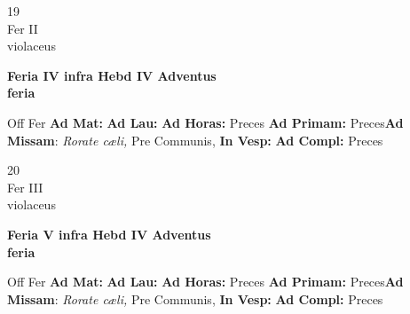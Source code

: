 \documentclass[10pt, openany]{book}
\begin{document}
    \begin{center}
        \begin{minipage}{3.5in}
            \vspace{2em}
            \begin{minipage}{0.5in}
                {\Huge 19} \\
                {\normalsize Fer II} \\
                {\normalsize violaceus}
            \end{minipage}
            \begin{minipage}{3.0in}
                \textbf{ \large Feria IV infra Hebd IV Adventus \\
                \textnormal{\normalsize feria}} \\ 
            \end{minipage}
            \begin{justify}Off Fer
                \textbf{Ad Mat: }
                \textbf{Ad Lau: }
                \textbf{Ad Horas: }Preces
                \textbf{Ad Primam: }Preces\textbf{Ad Missam}: \textit{Rorate cæli,} Pre Communis,  
                \textbf{In Vesp: }
                \textbf{Ad Compl: }Preces
            \end{justify}
        \end{minipage}
    \end{center}

    \begin{center}
        \begin{minipage}{3.5in}
            \vspace{2em}
            \begin{minipage}{0.5in}
                {\Huge 20} \\
                {\normalsize Fer III} \\
                {\normalsize violaceus}
            \end{minipage}
            \begin{minipage}{3.0in}
                \textbf{ \large Feria V infra Hebd IV Adventus \\
                \textnormal{\normalsize feria}} \\ 
            \end{minipage}
            \begin{justify}Off Fer
                \textbf{Ad Mat: }
                \textbf{Ad Lau: }
                \textbf{Ad Horas: }Preces
                \textbf{Ad Primam: }Preces\textbf{Ad Missam}: \textit{Rorate cæli,} Pre Communis,  
                \textbf{In Vesp: }
                \textbf{Ad Compl: }Preces
            \end{justify}
        \end{minipage}
    \end{center}
\end{document}
